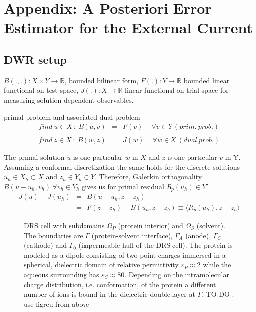 \documentclass[runningheads]{lncse}
\begin{document}
\section*{Appendix: A Posteriori Error Estimator for the External Current}

\subsection{DWR setup}

$B(.,.) : X \times Y \to \mathbb{R}$, bounded bilinear form, $F(.) : Y  \to \mathbb{R}$ bounded linear functional on test space, $J(.) : X  \to \mathbb{R}$ linear functional on trial space for measuring solution-dependent observables.

primal problem and associated dual problem
%
\begin{eqnarray}
\label{eq:prim-p}
find ~ u \in X ~: ~ B(u,v) & = & F(v) ~ \quad \forall v \in Y ~(prim.~prob.) \\
%
\nonumber \\
\label{eq:dual-p}
find ~ z \in X ~: ~ B(w,z) & = & J(w) ~  \quad \forall w \in X ~(dual~prob.) 
\end{eqnarray}

The primal solution $u$ is one particular $w$ in $X$ and $z$ is one particular $v$ in Y. 
%
Assuming a conformal discretization the same holds for the discrete solutions $u_h \in X_h \subset X$ and $z_h \in Y_h \subset Y$.
%
Therefore, Galerkin orthogonality $B(u-u_h, v_h) ~\forall v_h \in Y_h$ gives us for primal residual $R_p(u_h) \in Y' $
% 
\begin{eqnarray}
\label{eq:J-err}
J(u) - J(u_h) & = & B(u-u_h, z-z_h) \nonumber \\
&= & F(z-z_h) - B(u_h, z-z_h) \equiv \langle R_p(u_h), z-z_h  \rangle  
\end{eqnarray}
%
\begin{figure}[b]
%
\caption{DRS cell with subdomains $\Omega_P$ (protein interior) and $\Omega_S$ (solvent). 
%
The boundaries are $\Gamma$ (protein-solvent interface),  $\Gamma_A$ (anode), $\Gamma_C$ (cathode) and $\Gamma_0$ (impermeable hull of the DRS cell). 
%
The protein is modeled as a dipole consisting of two point charges immersed in a spherical, dielectric domain of relative permittivity $\varepsilon_P \approx 2$ while the aqueous surrounding has $\varepsilon_S \approx 80$. Depending on the intramolecular charge distribution, i.e.  conformation, of the protein a different number of ions is bound in the dielectric double layer at $\Gamma$. TO DO : use figreu from above}
\label{fig:drs-setup-and-effect-2}    
\end{figure}
\end{document}
